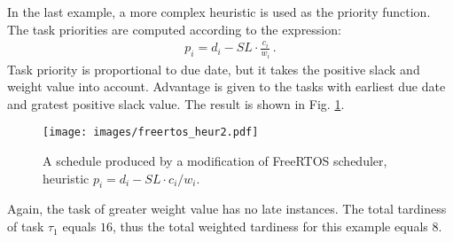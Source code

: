 In the last example, a more complex heuristic is used as the priority function.
The task priorities are computed according to the expression:
\begin{align*}
p_i = d_i - SL \cdot \frac{c_i}{w_i} \, .
\end{align*}
Task priority is proportional to due date, but it takes the positive slack and weight value into account.
Advantage is given to the tasks with earliest due date and gratest positive slack value.
The result is shown in Fig. \ref{freertos_2}.
\begin{figure}[ht]
    \centering
    \texttt{[image: images/freertos\_heur2.pdf]}
    \caption{A schedule produced by a modification of FreeRTOS scheduler, heuristic $p_i = d_i - SL \cdot c_i / w_i$.}
    \label{freertos_2}
\end{figure}
Again, the task of greater weight value has no late instances.
The total tardiness of task $\tau_1$ equals $16$, thus the total weighted tardiness for this example equals $8$.